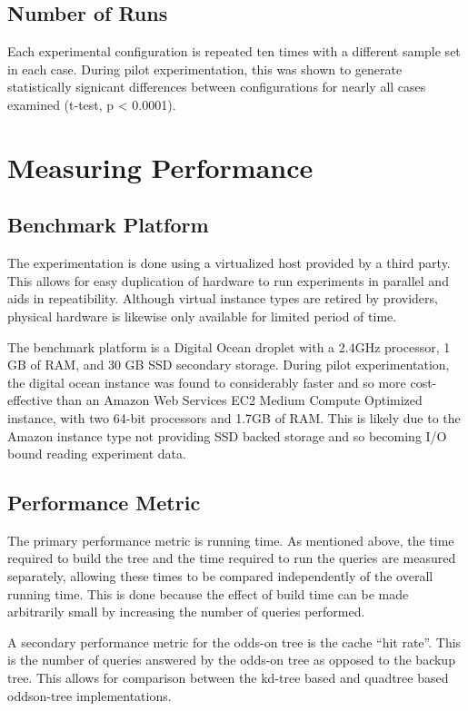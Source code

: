 \documentclass[mcs]{scsthesis}
\begin{document}
\subsection{Number of Runs}

Each experimental configuration is repeated ten times with a different sample
set in each case. During pilot experimentation, this was shown to generate
statistically signicant differences between configurations for nearly all cases
examined (t-test, p < 0.0001).

\section{Measuring Performance}

\subsection{Benchmark Platform}

The experimentation is done using a virtualized host provided by a third party.
This allows for easy duplication of hardware to run experiments in parallel and
aids in repeatibility. Although virtual instance types are retired by
providers, physical hardware is likewise only available for limited period of
time.

The benchmark platform is a Digital Ocean droplet with a 2.4GHz processor, 1 GB
of RAM, and 30 GB SSD secondary storage. During pilot experimentation, the
digital ocean instance was found to considerably faster and so more
cost-effective than an Amazon Web Services EC2 Medium Compute Optimized
instance, with two 64-bit processors and 1.7GB of RAM. This is likely due to the
Amazon instance type not providing SSD backed storage and so becoming I/O bound 
reading experiment data. 

\subsection{Performance Metric}

The primary performance metric is running time. As mentioned above, the time
required to build the tree and the time required to run the queries are measured
separately, allowing these times to be compared independently of the overall
running time. This is done because the effect of build time can be made
arbitrarily small by increasing the number of queries performed.

A secondary performance metric for the odds-on tree is the cache ``hit rate''.
This is the number of queries answered by the odds-on tree as opposed to the
backup tree. This allows for comparison between the kd-tree based and quadtree
based oddson-tree implementations. 
\end{document}

